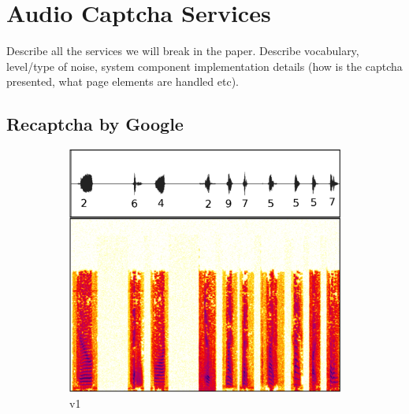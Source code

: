 \section{Audio Captcha Services}
\label{sec:services}

Describe all the services we will break in the paper. Describe vocabulary, level/type of noise,
system component implementation details (how is the captcha presented, what page elements are handled etc).

\subsection{Recaptcha by Google}

\begin{figure}[tp]
\begin{subfigure}{0.3\textwidth}
        \includegraphics[width=\textwidth]{figures/recaptcha1.pdf}
        \caption{\re v1}
        \label{fig:recaptcha1}
\end{subfigure} \hspace{0.03\textwidth}
\begin{subfigure}{0.3\textwidth}

\end{subfigure}
\end{figure}
